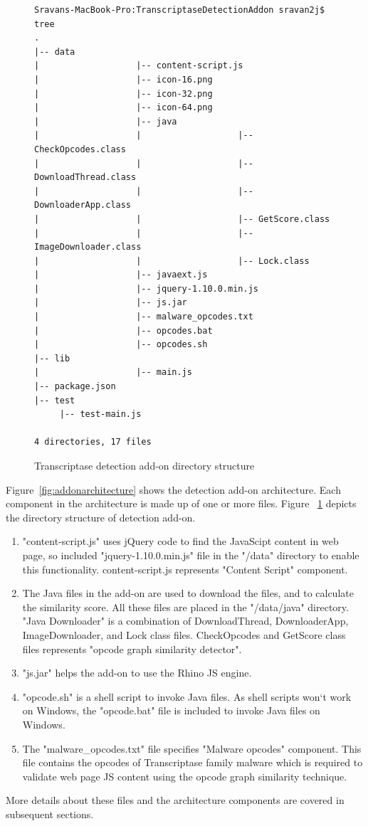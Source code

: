 \begin{figure}[h]
  \centering
\begin{lstlisting}[style=BashInputStyle,numbers=none,mathescape=false,tabsize=4,keywords=none]
Sravans-MacBook-Pro:TranscriptaseDetectionAddon sravan2j$ tree
.
|-- data
|  	  	  	  	   	|-- content-script.js
|  	  	  	  	   	|-- icon-16.png
|  	  	  	   	   	|-- icon-32.png
|  	  	  	  	   	|-- icon-64.png
|  	  	  	  	   	|-- java
|  	  	  	  	   	|  	  	  	  	   	|-- CheckOpcodes.class
|  	  	  	  	   	|  	  	  	  	   	|-- DownloadThread.class
|  	  	  	  	   	|  	  	  	  	   	|-- DownloaderApp.class
|  	  	  	  	   	|  	  	  	  	   	|-- GetScore.class
|  	  	  	  	   	|  	  	  	  	   	|-- ImageDownloader.class
|  	  	  	  	   	|  	  	  	  	   	|-- Lock.class
|  	  	  	  	   	|-- javaext.js
|  	  	  	  	   	|-- jquery-1.10.0.min.js
|  	  	  	  	   	|-- js.jar
|  	  	  	  	   	|-- malware_opcodes.txt
|  	  	  	  	   	|-- opcodes.bat
|  	  	  	  	   	|-- opcodes.sh
|-- lib
|  	  	  	  	   	|-- main.js
|-- package.json
|-- test
  	 |-- test-main.js
	
4 directories, 17 files
\end{lstlisting}
    \caption[Transcriptase detection add-on directory structure]{Transcriptase detection add-on directory structure}
    \label{fig:transdetectaddon}
\end{figure}
Figure~\ref{fig:addonarchitecture} shows the detection add-on architecture. Each component in the architecture is made up of one or more files. Figure ~\ref{fig:transdetectaddon} depicts the directory structure of detection add-on. 
\begin{enumerate}
\item "content-script.js" uses jQuery code to find the JavaScipt content in web page, so included "jquery-1.10.0.min.js" file in the "/data" directory to enable this functionality. content-script.js represents "Content Script" component.
\item The Java files in the add-on are used to download the files, and to calculate the similarity score. All these files are placed in the "/data/java" directory. "Java Downloader" is a combination of DownloadThread, DownloaderApp, ImageDownloader, and Lock class files. CheckOpcodes and GetScore class files represents "opcode graph similarity detector".
\item "js.jar" helps the add-on to use the Rhino JS engine.
\item "opcode.sh" is a shell script to invoke Java files. As shell scripts won`t work on Windows, the "opcode.bat" file is included to invoke Java files on Windows. 
\item The "malware\_opcodes.txt" file specifies "Malware opcodes" component. This file contains the opcodes of Transcriptase family malware which is required to validate web page JS content using the opcode graph similarity technique. 
\end{enumerate}
More details about these files and the architecture components are covered in subsequent sections.

